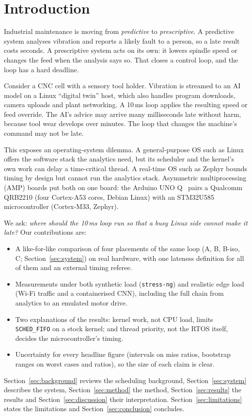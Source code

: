 \section{Introduction}
\label{sec:intro}

Industrial maintenance is moving from \emph{predictive} to \emph{prescriptive}. A predictive system analyses vibration and reports a likely fault to a person, so a late result costs seconds. A prescriptive system acts on its own: it lowers spindle speed or changes the feed when the analysis says so. That closes a control loop, and the loop has a hard deadline.

Consider a CNC cell with a sensory tool holder. Vibration is streamed to an AI model on a Linux ``digital twin'' host, which also handles program downloads, camera uploads and plant networking. A 10\,ms loop applies the resulting speed or feed override. The AI's advice may arrive many milliseconds late without harm, because tool wear develops over minutes. The loop that changes the machine's command may not be late.

This exposes an operating-system dilemma. A general-purpose OS such as Linux offers the software stack the analytics need, but its scheduler and the kernel's own work can delay a time-critical thread. A real-time OS such as Zephyr bounds timing by design but cannot run the analytics stack. Asymmetric multiprocessing (AMP) boards put both on one board: the Arduino UNO Q~\cite{arduino_unoq} pairs a Qualcomm QRB2210 (four Cortex-A53 cores, Debian Linux) with an STM32U585 microcontroller (Cortex-M33, Zephyr).

We ask: \emph{where should the 10\,ms loop run so that a busy Linux side cannot make it late?} Our contributions are:
\begin{itemize}
\item A like-for-like comparison of four placements of the same loop (A, B, B-iso, C; Section~\ref{sec:system}) on real hardware, with one lateness definition for all of them and an external timing referee.
\item Measurements under both synthetic load (\texttt{stress-ng}) and realistic edge load (Wi-Fi traffic and a containerised CNN), including the full chain from analytics to an emulated motor drive.
\item Two explanations of the results: kernel work, not CPU load, limits \texttt{SCHED\_FIFO} on a stock kernel; and thread priority, not the RTOS itself, decides the microcontroller's timing.
\item Uncertainty for every headline figure (intervals on miss ratios, bootstrap ranges on worst cases and ratios), so the size of each claim is clear.
\end{itemize}

Section~\ref{sec:background} reviews the scheduling background, Section~\ref{sec:system} describes the system, Section~\ref{sec:method} the method, Section~\ref{sec:results} the results and Section~\ref{sec:discussion} their interpretation. Section~\ref{sec:limitations} states the limitations and Section~\ref{sec:conclusion} concludes.
